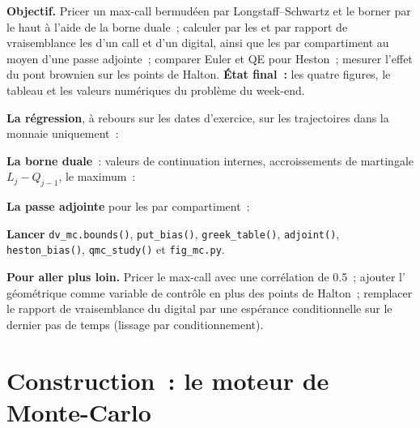 \begin{tutorial}
\textbf{Objectif.} Pricer un max-call bermudéen par Longstaff--Schwartz et le borner par le haut à l'aide de la borne duale~; calculer par les  et par rapport de vraisemblance les  d'un call et d'un digital, ainsi que les  par compartiment au moyen d'une passe adjointe~;
comparer Euler et QE pour Heston~; mesurer l'effet du pont brownien sur les
points de Halton. \textbf{État final~:} les quatre figures, le tableau et les valeurs numériques du problème du week-end.
\begin{tutsteps}
\item \textbf{La régression}, à rebours sur les dates d'exercice, sur les trajectoires dans la monnaie uniquement~:
\label{lst:dv:monte-carlo-pricers-in-practice:lsm}
\item \textbf{La borne duale}~: valeurs de continuation internes, accroissements de martingale $L_j-Q_{j-1}$, le maximum~:
\label{lst:dv:monte-carlo-pricers-in-practice:dual}
\item \textbf{La passe adjointe} pour les  par compartiment~:
\label{lst:dv:monte-carlo-pricers-in-practice:adjoint}
\item \textbf{Lancer} \texttt{dv\_mc.bounds()}, \texttt{put\_bias()}, \texttt{greek\_table()}, \texttt{adjoint()}, \texttt{heston\_bias()}, \texttt{qmc\_study()}
et \texttt{fig\_mc.py}.
\end{tutsteps}
\textbf{Pour aller plus loin.} Pricer le max-call avec une corrélation de 0.5~; ajouter l' géométrique comme variable de contrôle en plus des points de Halton~; remplacer le
rapport de vraisemblance du digital par une espérance conditionnelle sur le dernier pas de temps (lissage par conditionnement).
\end{tutorial}

\section{Construction~: le moteur de Monte-Carlo}\label{bld:dv:monte-carlo-pricers-in-practice:mcpricer}

